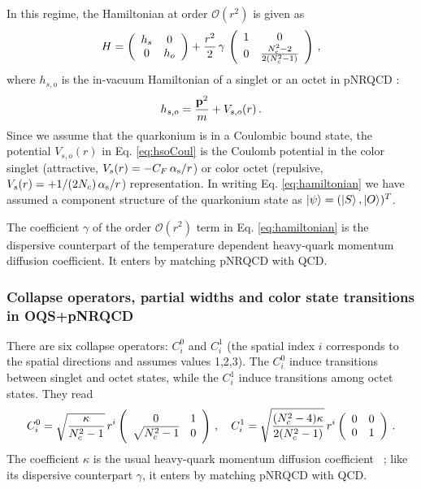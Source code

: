 \documentclass[times,sort&compress,final]{elsarticle}
\def\als{\alpha_{\rm s}}
\begin{document}
In this regime, the Hamiltonian at order $\mathcal{O}(r^2)$ is given as 
\begin{equation}
H = \left(\begin{array}{c c}
h_s & 0\\
0 & h_o
\end{array}\right)
+ \frac{r^2}{2}\,\gamma\, 
\left(\begin{array}{c c}
1 & 0\\
0 & \frac{N_c^2-2}{2(N_c^2-1)}
\end{array}\right)\,,
\label{eq:hamiltonian}
\end{equation}
where $h_{s,o}$ is the in-vacuum Hamiltonian of a singlet or an octet in pNRQCD \cite{Pineda:1997bj,Brambilla:1999xf}:
\begin{equation}
h_{s,o} = \frac{{\bf p}^2}{m} +V_{s,o}(r)\,.
\label{eq:hsoCoul}
\end{equation}
Since we assume that the quarkonium is in a Coulombic bound state, the potential $V_{s,o}(r)$ in Eq. \eqref{eq:hsoCoul} 
is the Coulomb potential in the color singlet (attractive, $V_s(r) =-C_F\, \als/r$) or color octet (repulsive, 
$V_s(r) =+1/(2N_c)\, \als/r$) representation. 
In writing Eq. \eqref{eq:hamiltonian} we have assumed a component structure of the quarkonium state 
as $ \ket{ \psi} = ( \ket{S} , \ket{O} )^T$. 

The coefficient $\gamma$ of the order $\mathcal{O}(r^2)$ term in Eq. \eqref{eq:hamiltonian} is the dispersive 
counterpart of the temperature dependent heavy-quark momentum diffusion coefficient. 
It enters by matching pNRQCD with QCD.

\subsubsection{Collapse operators, partial widths and color state transitions in OQS+pNRQCD}

There are six collapse operators: $C^0_i$ and $C^1_i$ (the spatial index $i$ 
corresponds to the spatial directions and assumes values 1,2,3).
The $C^0_i$ induce transitions between singlet and octet states, while the $C^1_i$ induce 
transitions among octet states.
They read
\begin{equation}
C^0_i=\sqrt{\frac{\kappa}{N_c^2-1}}\,r^i\left(\begin{array}{c c}
0 & 1\\
\sqrt{N_c^2-1} & 0
\end{array}\right)\,,\quad
C^1_i=\sqrt{\frac{(N_c^2-4)\kappa}{2(N_c^2-1)}}\,r^i\left(\begin{array}{c c}
0 & 0\\
0 & 1
\end{array}\right)\,.
\label{eq:collapse}
\end{equation}
The coefficient $\kappa$ is the usual heavy-quark momentum diffusion 
coefficient ~\cite{CasalderreySolana:2006rq,CaronHuot:2007gq};
like its dispersive counterpart $\gamma$, it enters by matching pNRQCD with QCD.
\end{document}

